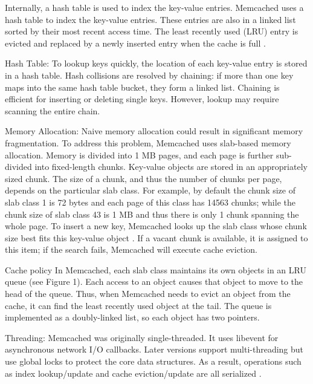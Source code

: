 \documentclass[9pt,twocolumn,twoside]{../../styles/osajnl}
\begin{document}
Internally, a hash table is used to index the key-value
entries. Memcached uses a hash table to index the key-value
entries. These entries are also in a linked list sorted by their most
recent access time.  The least recently used (LRU) entry is evicted
and replaced by a newly inserted entry when the cache is full
\cite{www-memcached-blog}.


Hash Table: To lookup keys quickly, the location of each key-value
entry is stored in a hash table. Hash collisions are resolved by
chaining: if more than one key maps into the same hash table bucket,
they form a linked list.  Chaining is efficient for inserting or
deleting single keys.  However, lookup may require scanning the entire
chain.


Memory Allocation: Naive memory allocation could result in significant
memory fragmentation.  To address this problem, Memcached uses
slab-based memory allocation. Memory is divided into 1 MB pages, and
each page is further sub-divided into fixed-length chunks. Key-value
objects are stored in an appropriately sized chunk. The size of a chunk,
and thus the number of chunks per page, depends on the particular slab
class. For example, by default the chunk size of slab class 1 is 72
bytes and each page of this class has 14563 chunks; while the chunk
size of slab class 43 is 1 MB and thus there is only 1 chunk spanning
the whole page.  To insert a new key, Memcached looks up the slab
class whose chunk size best fits this key-value object
\cite{www-memcached-blog}. If a vacant chunk is available, it is
assigned to this item; if the search fails, Memcached will execute
cache eviction.


Cache policy In Memcached, each slab class maintains its own objects
in an LRU queue (see Figure 1). Each access to an object causes that
object to move to the head of the queue. Thus, when Memcached needs to
evict an object from the cache, it can find the least recently used
object at the tail. The queue is implemented as a doubly-linked list,
so each object has two pointers.


Threading: Memcached was originally single-threaded.  It uses libevent
for asynchronous network I/O callbacks. Later versions support
multi-threading but use global locks to protect the core data
structures. As a result, operations such as index lookup/update and
cache eviction/update are all serialized \cite{www-memcached-blog}.

\end{document}

